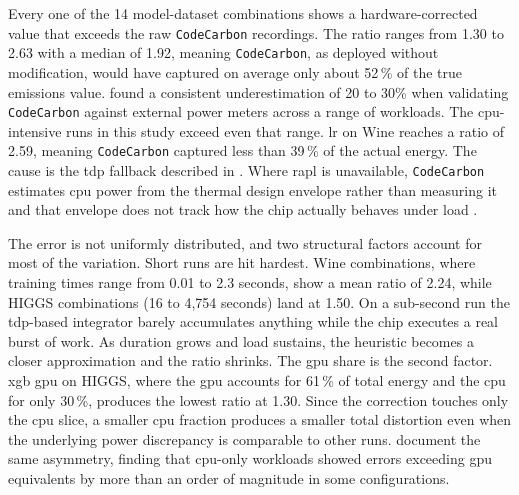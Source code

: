 Every one of the 14 model-dataset combinations shows a hardware-corrected value that exceeds the raw \texttt{CodeCarbon} recordings. The ratio ranges from 1.30 to 2.63 with a median of 1.92, meaning \texttt{CodeCarbon}, as deployed without modification, would have captured on average only about 52\,\% of the true emissions value. \citeauthor{fischerGroundTruthingAIEnergy2025} \parencite{fischerGroundTruthingAIEnergy2025} found a consistent underestimation of 20 to 30\% when validating \texttt{CodeCarbon} against external power meters across a range of workloads. The \gls{cpu}-intensive runs in this study exceed even that range. \gls{lr} on Wine reaches a ratio of 2.59, meaning \texttt{CodeCarbon} captured less than 39\,\% of the actual energy. The cause is the \gls{tdp} fallback described in . Where \gls{rapl} is unavailable, \texttt{CodeCarbon} estimates \gls{cpu} power from the thermal design envelope rather than measuring it and that envelope does not track how the chip actually behaves under load \parencite{hendersonSystematicReportingEnergy2020}.

The error is not uniformly distributed, and two structural factors account for most of the variation. Short runs are hit hardest. Wine combinations, where training times range from 0.01 to 2.3 seconds, show a mean ratio of 2.24, while HIGGS combinations (16 to 4{,}754 seconds) land at 1.50. On a sub-second run the \gls{tdp}-based integrator barely accumulates anything while the chip executes a real burst of work. As duration grows and load sustains, the heuristic becomes a closer approximation and the ratio shrinks. The \gls{gpu} share is the second factor. \gls{xgb} \gls{gpu} on HIGGS, where the \gls{gpu} accounts for 61\,\% of total energy and the \gls{cpu} for only 30\,\%, produces the lowest ratio at 1.30. Since the correction touches only the \gls{cpu} slice, a smaller \gls{cpu} fraction produces a smaller total distortion even when the underlying power discrepancy is comparable to other runs. \citeauthor{fischerGroundTruthingAIEnergy2025} \parencite{fischerGroundTruthingAIEnergy2025} document the same asymmetry, finding that \gls{cpu}-only workloads showed errors exceeding \gls{gpu} equivalents by more than an order of magnitude in some configurations.

